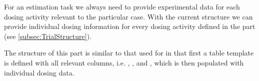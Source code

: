For an estimation task we always need to provide experimental data for each dosing activity 
relevant to the particular case. With the current structure we can provide individual dosing 
information for every dosing activity defined in the  part (see \ref{subsec:TrialStructure}).

The structure of this part is similar to that used for  in that first
a table template is defined with all relevant columns, i.e. , , and ,
which is then populated with individual dosing data.


%
%
%



